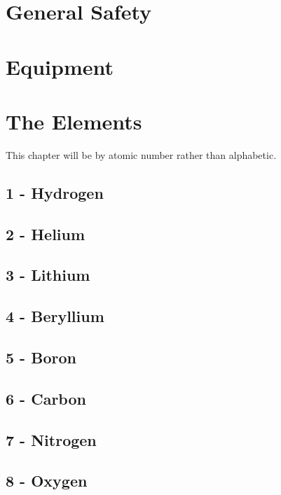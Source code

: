 \documentclass{book}
\begin{document}
\chapter{General Safety}

\chapter{Equipment}

\chapter{The Elements}
This chapter will be by atomic number rather than alphabetic.

\section{1 - Hydrogen}
\label{sec:elem-hydrogen}

\section{2 - Helium}
\label{sec:elem-helium}

\section{3 - Lithium}
\label{sec:elem-lithium}

\section{4 - Beryllium}
\label{sec:elem-beryllium}

\section{5 - Boron}
\label{sec:elem-boron}

\section{6 - Carbon}
\label{sec:elem-carbon}

\section{7 - Nitrogen}
\label{sec:elem-nitrogen}

\section{8 - Oxygen}
\label{sec:elem-oxygen}
\end{document}

